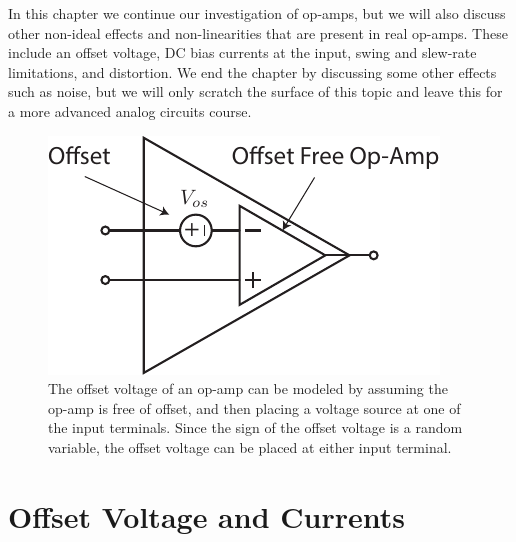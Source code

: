In this chapter we continue our investigation of op-amps, but we will also discuss other non-ideal effects and non-linearities that are present in real op-amps.  These include an offset voltage, DC bias currents at the input, swing and slew-rate limitations, and distortion.  We end the chapter by discussing some other effects such as noise, but we will only scratch the surface of this topic and leave this for a more advanced analog circuits course.
\newpage
\begin{figure}[tb]
\centering
\includegraphics[scale=1.15]{opamp_offset}
\caption{The offset voltage of an op-amp can be modeled by assuming the op-amp is free of offset, and then placing a voltage source at one of the input terminals.  Since the sign of the offset voltage is a random variable, the offset voltage can be placed at either input terminal.}
\label{fig:opamp_offset}
\end{figure}
\section{Offset Voltage and Currents}
